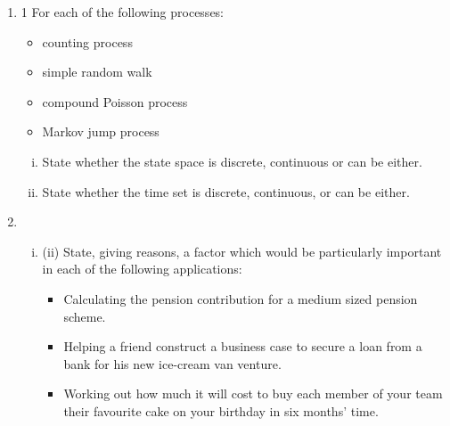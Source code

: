 \documentclass[a4paper,12pt]{article}
\begin{document}
\begin{enumerate}
\item 
1 For each of the following processes:
\begin{itemize}
\item  counting process
\item simple random walk
\item compound Poisson process
\item  Markov jump process
\end{itemize}
\begin{enumerate}[(i)]
\item State whether the state space is discrete, continuous or can be either. 
\item State whether the time set is discrete, continuous, or can be either. 
\end{enumerate}
\item 
\begin{enumerate}[(i)](i) List eight factors which should be considered when assessing whether a model is suitable for a particular application. 
\item (ii) State, giving reasons, a factor which would be particularly important in each of the following applications:
\begin{itemize}
    \item  Calculating the pension contribution for a medium sized pension scheme.
\item Helping a friend construct a business case to secure a loan from a bank for his new ice-cream van venture.
\item Working out how much it will cost to buy each member of your team their favourite cake on your birthday in six months’ time.
\end{itemize}
\end{enumerate}

\end{enumerate}
\end{document}
